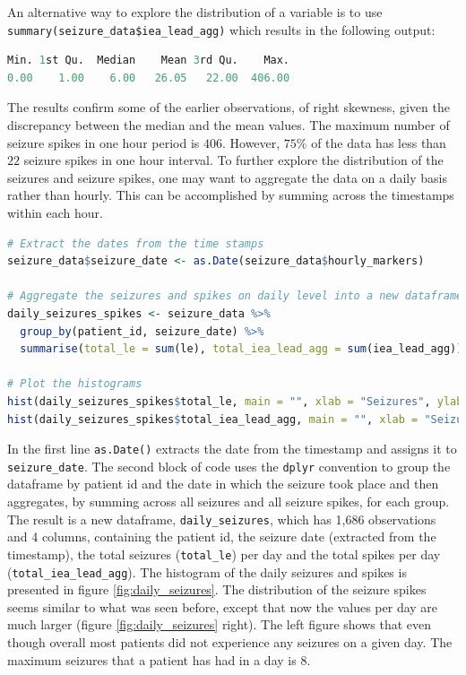 An alternative way to explore the distribution of a variable is to use \verb|summary(seizure_data$iea_lead_agg)| which results in the following output:
\begin{lstlisting}[language=R]
Min. 1st Qu.  Median    Mean 3rd Qu.    Max.
0.00    1.00    6.00   26.05   22.00  406.00
\end{lstlisting}
The results confirm some of the earlier observations, of right skewness, given the discrepancy between the median and the mean values. The maximum number of seizure spikes in one hour period is $406$. However, $75\%$ of the data has less than $22$ seizure spikes in one hour interval.
To further explore the distribution of the seizures and seizure spikes, one may want to aggregate the data on a daily basis rather than hourly. This can be accomplished by summing across the timestamps within each hour.
\begin{lstlisting}[language=R]
# Extract the dates from the time stamps
seizure_data$seizure_date <- as.Date(seizure_data$hourly_markers)

# Aggregate the seizures and spikes on daily level into a new dataframe
daily_seizures_spikes <- seizure_data %>%
  group_by(patient_id, seizure_date) %>%
  summarise(total_le = sum(le), total_iea_lead_agg = sum(iea_lead_agg))

# Plot the histograms
hist(daily_seizures_spikes$total_le, main = "", xlab = "Seizures", ylab = "Density", freq=FALSE)
hist(daily_seizures_spikes$total_iea_lead_agg, main = "", xlab = "Seizure Spikes", ylab = "Density", freq=FALSE)
\end{lstlisting}
In the first line \verb|as.Date()| extracts the date from the timestamp and assigns it to \verb|seizure_date|. The second block of code uses the \verb|dplyr| convention to group the dataframe by patient id and the date in which the seizure took place and then aggregates, by summing across all seizures and all seizure spikes, for each group. The result is a new dataframe, \verb|daily_seizures|, which has 1,686 observations and 4 columns, containing the patient id, the seizure date (extracted from the timestamp), the total seizures (\verb|total_le|) per day and the total spikes per day (\verb|total_iea_lead_agg|). The histogram of the daily seizures and spikes is presented in figure \ref{fig:daily_seizures}. The distribution of the seizure spikes seems similar to what was seen before, except that now the values per day are much larger (figure \ref{fig:daily_seizures} right). The left figure shows that even though overall most patients did not experience any seizures on a given day. The maximum seizures that a patient has had in a day is $8$.
